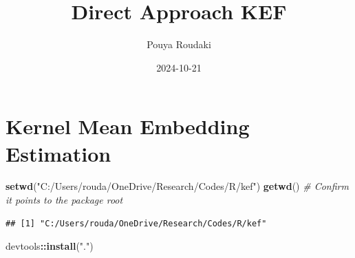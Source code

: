 \documentclass[
]{article}
\title{Direct Approach KEF}
\author{Pouya Roudaki}
\date{2024-10-21}
\newenvironment{Shaded}{\begin{snugshade}}{\end{snugshade}}
\newcommand{\CommentTok}[1]{\textcolor[rgb]{0.56,0.35,0.01}{\textit{#1}}}
\newcommand{\FunctionTok}[1]{\textcolor[rgb]{0.13,0.29,0.53}{\textbf{#1}}}
\newcommand{\NormalTok}[1]{#1}
\newcommand{\SpecialCharTok}[1]{\textcolor[rgb]{0.81,0.36,0.00}{\textbf{#1}}}
\newcommand{\StringTok}[1]{\textcolor[rgb]{0.31,0.60,0.02}{#1}}
\begin{document}
\maketitle

\section{Kernel Mean Embedding
Estimation}\label{kernel-mean-embedding-estimation}

\begin{Shaded}
\begin{Highlighting}[]
\FunctionTok{setwd}\NormalTok{(}\StringTok{"C:/Users/rouda/OneDrive/Research/Codes/R/kef"}\NormalTok{)}
\FunctionTok{getwd}\NormalTok{()  }\CommentTok{\# Confirm it points to the package root}
\end{Highlighting}
\end{Shaded}

\begin{verbatim}
## [1] "C:/Users/rouda/OneDrive/Research/Codes/R/kef"
\end{verbatim}

\begin{Shaded}
\begin{Highlighting}[]
\NormalTok{devtools}\SpecialCharTok{::}\FunctionTok{install}\NormalTok{(}\StringTok{"."}\NormalTok{)}
\end{Highlighting}
\end{Shaded}
\end{document}
